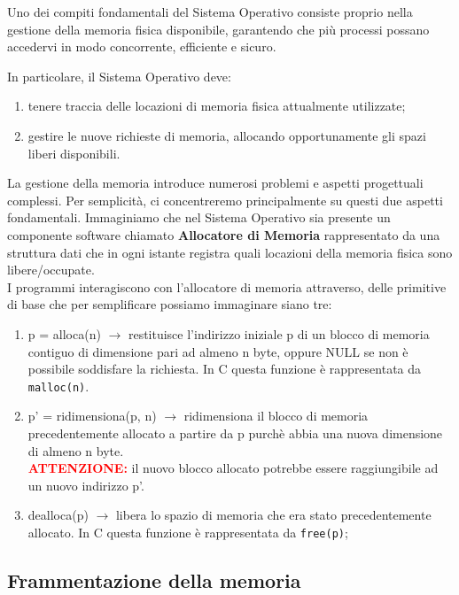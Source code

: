 \medskip

\noindent Uno dei compiti fondamentali del Sistema Operativo consiste proprio nella gestione della memoria fisica disponibile, garantendo che più processi possano accedervi in modo concorrente, efficiente e sicuro.

\noindent In particolare, il Sistema Operativo deve:

\begin{enumerate}
    \item tenere traccia delle locazioni di memoria fisica attualmente utilizzate;

    \item gestire le nuove richieste di memoria, allocando opportunamente gli spazi liberi disponibili.
\end{enumerate}

\noindent
La gestione della memoria introduce numerosi problemi e aspetti progettuali complessi.  
Per semplicità, ci concentreremo principalmente su questi due aspetti fondamentali.
Immaginiamo che nel Sistema Operativo sia presente un componente software chiamato
\textbf{Allocatore di Memoria} rappresentato da una struttura dati che in ogni istante registra quali
locazioni della memoria fisica sono libere/occupate.\\
I programmi interagiscono con l'allocatore di memoria attraverso, delle primitive di base
che per semplificare possiamo immaginare siano tre:
\begin{enumerate}
    \item p = alloca(n) $\rightarrow$ restituisce l'indirizzo iniziale p di un blocco di memoria 
    contiguo di dimensione pari ad almeno n byte, oppure NULL se non è possibile soddisfare la richiesta.
    In C questa funzione è rappresentata da \texttt{malloc(n)}.
    \item p' = ridimensiona(p, n) $\rightarrow$ ridimensiona il blocco di memoria precedentemente allocato 
    a partire da p purchè abbia una nuova dimensione di almeno n byte.\\
    \textbf{\textcolor{red}{ATTENZIONE:}} il nuovo blocco allocato potrebbe essere raggiungibile 
    ad un nuovo indirizzo p'.
    \item dealloca(p) $\rightarrow$ libera lo spazio di memoria che era stato precedentemente allocato. In 
    C questa funzione è rappresentata da \texttt{free(p)};
\end{enumerate}
\subsection{Frammentazione della memoria}

